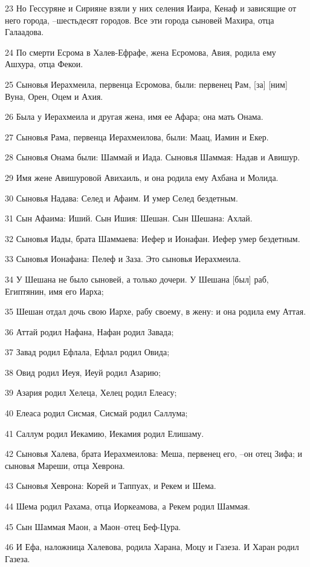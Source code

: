 \par 23 Но Гессуряне и Сирияне взяли у них селения Иаира, Кенаф и зависящие от него города, --шестьдесят городов. Все эти города сыновей Махира, отца Галаадова.
\par 24 По смерти Есрома в Халев-Ефрафе, жена Есромова, Авия, родила ему Ашхура, отца Фекои.
\par 25 Сыновья Иерахмеила, первенца Есромова, были: первенец Рам, [за] [ним] Вуна, Орен, Оцем и Ахия.
\par 26 Была у Иерахмеила и другая жена, имя ее Афара; она мать Онама.
\par 27 Сыновья Рама, первенца Иерахмеилова, были: Маац, Иамин и Екер.
\par 28 Сыновья Онама были: Шаммай и Иада. Сыновья Шаммая: Надав и Авишур.
\par 29 Имя жене Авишуровой Авихаиль, и она родила ему Ахбана и Молида.
\par 30 Сыновья Надава: Селед и Афаим. И умер Селед бездетным.
\par 31 Сын Афаима: Иший. Сын Ишия: Шешан. Сын Шешана: Ахлай.
\par 32 Сыновья Иады, брата Шаммаева: Иефер и Ионафан. Иефер умер бездетным.
\par 33 Сыновья Ионафана: Пелеф и Заза. Это сыновья Иерахмеила.
\par 34 У Шешана не было сыновей, а только дочери. У Шешана [был] раб, Египтянин, имя его Иарха;
\par 35 Шешан отдал дочь свою Иархе, рабу своему, в жену: и она родила ему Аттая.
\par 36 Аттай родил Нафана, Нафан родил Завада;
\par 37 Завад родил Ефлала, Ефлал родил Овида;
\par 38 Овид родил Иеуя, Иеуй родил Азарию;
\par 39 Азария родил Хелеца, Хелец родил Елеасу;
\par 40 Елеаса родил Сисмая, Сисмай родил Саллума;
\par 41 Саллум родил Иекамию, Иекамия родил Елишаму.
\par 42 Сыновья Халева, брата Иерахмеилова: Меша, первенец его, --он отец Зифа; и сыновья Мареши, отца Хеврона.
\par 43 Сыновья Хеврона: Корей и Таппуах, и Рекем и Шема.
\par 44 Шема родил Рахама, отца Иоркеамова, а Рекем родил Шаммая.
\par 45 Сын Шаммая Маон, а Маон--отец Беф-Цура.
\par 46 И Ефа, наложница Халевова, родила Харана, Моцу и Газеза. И Харан родил Газеза.
